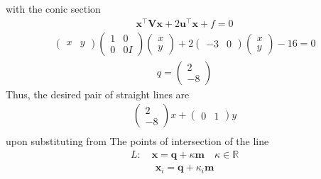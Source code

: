 \documentclass[10pt,a4paper]{report}
\newcommand{\myvec}[1]{\ensuremath{\begin{pmatrix}#1\end{pmatrix}}}
\let\vec\mathbf
\let\vec\mathbf
\begin{document}
\begin{multicols}{2}
with the conic section 
\begin{align}
	\vec{x}^{\top}\vec{V}\vec{x} + 2\vec{u}^{\top} \vec{x} + f = 0
\label{eq:conic_quad_form}
\end{align}
\begin{align}
    \myvec{x & y}\myvec{
1 & 0\\
0 & 0I
}\myvec{x \\ y}+2\myvec{-3 & 0}\myvec{x\\y}-16=0
\end{align}\begin{align}
   q=\myvec{2\\-8} 
\end{align}
\noindent Thus, the desired pair of straight lines are \\
\begin{align} 
	\myvec{2 \\-8 }x+ \myvec{0 &1}y
	\\
\end{align} 
upon substituting from  The points of intersection of the line 
\begin{align}
L: \quad \vec{x} = \vec{q} + \kappa \vec{m} \quad \kappa \in \mathbb{R}
\label{eq:conic_tangent}
\end{align}
\begin{align}
\vec{x}_i = \vec{q} + \kappa_i \vec{m}
\label{eq:conic_tangent_pts}
\end{align}


\end{multicols}
\end{document}
